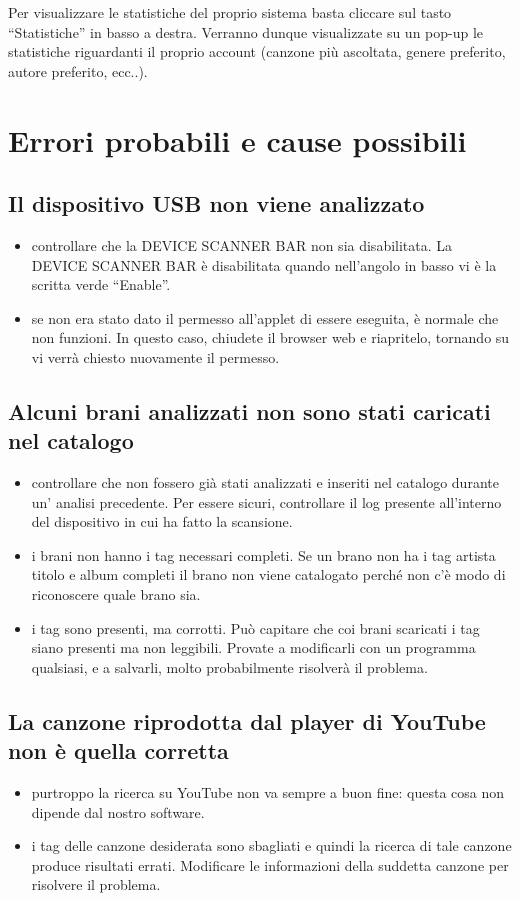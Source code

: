 Per visualizzare le statistiche del proprio sistema basta cliccare sul tasto
``Statistiche'' in basso a destra. Verranno dunque visualizzate su un pop-up le
statistiche riguardanti il proprio account (canzone pi\`u
ascoltata, genere preferito, autore preferito, ecc..).

\section{Errori probabili e cause possibili}

\subsection*{Il dispositivo USB non viene analizzato}
\begin{itemize}
  \item controllare che la DEVICE SCANNER BAR non sia disabilitata. La DEVICE
  SCANNER BAR \`e disabilitata quando nell'angolo in basso vi \`e la scritta
  verde ``Enable''.
  \item se non era stato dato il permesso all'applet di essere eseguita, \`e
  normale che non funzioni. In questo caso, chiudete il browser web e
  riapritelo, tornando su  vi verr\`a chiesto nuovamente il
  permesso.
\end{itemize}

\subsection*{Alcuni brani analizzati non sono stati caricati nel catalogo}
\begin{itemize}
  \item controllare che non fossero gi\`a stati analizzati e inseriti nel
  catalogo durante un' analisi precedente. Per essere sicuri, controllare il log
  presente all'interno del dispositivo in cui  ha fatto la scansione.
  \item i brani non hanno i tag necessari completi. Se un brano non ha i
  tag artista titolo e album completi il brano non viene catalogato perch\'e non
  c'\`e modo di riconoscere quale brano sia.
  \item i tag sono presenti, ma corrotti. Pu\`o capitare che coi brani scaricati i tag
  siano presenti ma non leggibili. Provate a modificarli con un programma qualsiasi, e 
  a salvarli, molto probabilmente risolver\`a il problema.
\end{itemize}

\subsection*{La canzone riprodotta dal player di YouTube non \`e quella
corretta}
\begin{itemize}
  \item purtroppo la ricerca su YouTube non va sempre a buon fine: questa cosa
  non dipende dal nostro software.
  \item i tag delle canzone desiderata sono sbagliati e quindi la
  ricerca di tale canzone produce risultati errati. Modificare le informazioni
  della suddetta canzone per risolvere il problema.
\end{itemize}

